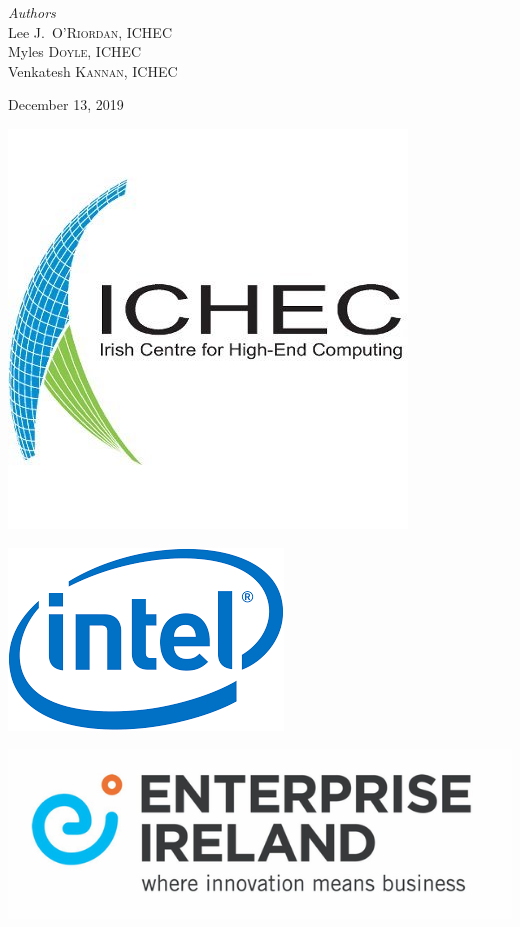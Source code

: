 \documentclass[11pt]{article}
\begin{document}
\begin{titlepage}
\vfill
\begin{center} \large
\emph{Authors}\\[0.5cm]
Lee J.~\textsc{O'Riordan}, ICHEC\\[0.2cm]
Myles \textsc{Doyle}, ICHEC\\[0.2cm]
Venkatesh \textsc{Kannan}, ICHEC
\end{center}
\vfill
{\large December 13, 2019}\\[1cm] 
\vfill
\hfill
\begin{minipage}{0.4\textwidth}
  \begin{center}
    \includegraphics[scale=0.3]{ichec_logo.jpeg}
  \end{center}
\end{minipage}
\hfill
\begin{minipage}{0.4\textwidth}
  \begin{center}
    \includegraphics[scale=0.3]{intel_logo.png}
  \end{center}
\end{minipage}
\vfill
\includegraphics[scale=0.3]{ei_logo.JPG}
\vfill
\end{titlepage}
\end{document}
